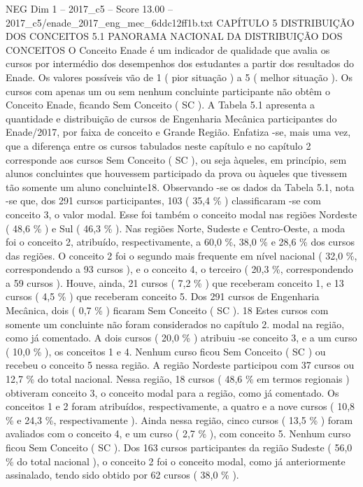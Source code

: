 \begin{textsample}{NEG Dim 1 – 2017\_c5 – Score 13.00 – 2017\_c5/enade\_2017\_eng\_mec\_6ddc12ff1b.txt}  \label{ex:f1_neg_385}
CAPÍTULO 5 DISTRIBUIÇÃO DOS CONCEITOS 5.1 PANORAMA NACIONAL DA DISTRIBUIÇÃO DOS CONCEITOS O Conceito Enade é um indicador de qualidade que avalia os cursos por intermédio dos desempenhos dos estudantes a partir dos resultados do Enade.
Os valores possíveis vão de 1 ( pior situação ) a 5 ( melhor situação ).
Os cursos com apenas um ou sem nenhum concluinte participante não obtêm o Conceito Enade, ficando Sem Conceito ( SC ).
A Tabela 5.1 apresenta a quantidade e distribuição de cursos de Engenharia Mecânica participantes do Enade/2017, por faixa de conceito e Grande Região.
Enfatiza -se, mais uma vez, que a diferença entre os cursos tabulados neste capítulo e no capítulo 2 corresponde aos cursos Sem Conceito ( SC ), ou seja àqueles, em princípio, sem alunos concluintes que houvessem participado da prova ou àqueles que tivessem tão somente um aluno concluinte18.
Observando -se os dados da Tabela 5.1, nota -se que, dos 291 cursos participantes, 103 ( 35,4 \% ) classificaram -se com conceito 3, o valor modal.
Esse foi também o conceito modal nas regiões Nordeste ( 48,6 \% ) e Sul ( 46,3 \% ).
Nas regiões Norte, Sudeste e Centro-Oeste, a moda foi o conceito 2, atribuído, respectivamente, a 60,0 \%, 38,0 \% e 28,6 \% dos cursos das regiões.
O conceito 2 foi o segundo mais frequente em nível nacional ( 32,0 \%, correspondendo a 93 cursos ), e o conceito 4, o terceiro ( 20,3 \%, correspondendo a 59 cursos ).
Houve, ainda, 21 cursos ( 7,2 \% ) que receberam conceito 1, e 13 cursos ( 4,5 \% ) que receberam conceito 5.
Dos 291 cursos de Engenharia Mecânica, dois ( 0,7 \% ) ficaram Sem Conceito ( SC ). 18 Estes cursos com somente um concluinte não foram considerados no capítulo 2. modal na região, como já comentado.
A dois cursos ( 20,0 \% ) atribuiu -se conceito 3, e a um curso ( 10,0 \% ), os conceitos 1 e 4.
Nenhum curso ficou Sem Conceito ( SC ) ou recebeu o conceito 5 nessa região.
A região Nordeste participou com 37 cursos ou 12,7 \% do total nacional.
Nessa região, 18 cursos ( 48,6 \% em termos regionais ) obtiveram conceito 3, o conceito modal para a região, como já comentado.
Os conceitos 1 e 2 foram atribuídos, respectivamente, a quatro e a nove cursos ( 10,8 \% e 24,3 \%, respectivamente ).
Ainda nessa região, cinco cursos ( 13,5 \% ) foram avaliados com o conceito 4, e um curso ( 2,7 \% ), com conceito 5.
Nenhum curso ficou Sem Conceito ( SC ).
Dos 163 cursos participantes da região Sudeste ( 56,0 \% do total nacional ), o conceito 2 foi o conceito modal, como já anteriormente assinalado, tendo sido obtido por 62 cursos ( 38,0 \% ).

\end{textsample}
